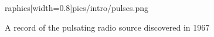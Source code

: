 \begin{figure}[h]
raphics[width=0.8\textwidth]{pics/intro/pulses.png}
  \caption[A record of pulsating radio source]{A record of the pulsating radio
    source discovered in 1967 \citep{1969Natur.224..472H}}
  \label{fig:pulse}
\end{figure}
%

